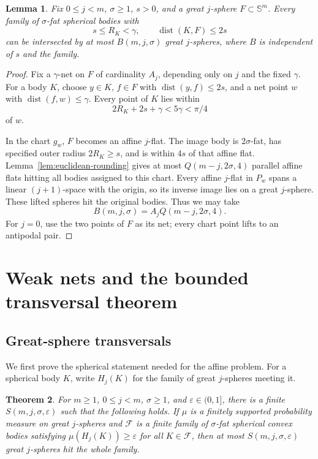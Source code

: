 \documentclass[11pt]{article}
\newtheorem{theorem}{Theorem}[section]
\newtheorem{lemma}[theorem]{Lemma}
\theoremstyle{remark}
\newcommand{\Sph}{\mathbb S}
\newcommand{\eps}{\varepsilon}
\newcommand{\dist}{\operatorname{dist}}
\begin{document}
\begin{lemma}
\label{lem:spherical-rounding}
Fix \(0\leq j<m\), \(\sigma\geq1\), \(s>0\), and a great
\(j\)-sphere \(F\subset\Sph^m\).
Every family of \(\sigma\)-fat spherical bodies with
\[
 s\leq R_K<\gamma,\qquad \dist(K,F)\leq2s
\]
can be intersected by at most \(B(m,j,\sigma)\) great \(j\)-spheres,
where \(B\) is independent of \(s\) and the family.
\end{lemma}

\begin{proof}
Fix a \(\gamma\)-net on \(F\) of cardinality \(A_j\), depending only
on \(j\) and the fixed \(\gamma\).
For a body \(K\), choose \(y\in K\), \(f\in F\) with
\(\dist(y,f)\leq2s\), and a net point \(w\) with
\(\dist(f,w)\leq\gamma\).
Every point of \(K\) lies within
\[
 2R_K+2s+\gamma<5\gamma<\pi/4
\]
of \(w\).

In the chart \(g_w\), \(F\) becomes an affine \(j\)-flat.
The image body is \(2\sigma\)-fat, has specified outer radius
\(2R_K\geq s\), and is within \(4s\) of that affine flat.
Lemma~\ref{lem:euclidean-rounding} gives at most
\(Q(m-j,2\sigma,4)\) parallel affine flats hitting all bodies
assigned to this chart.
Every affine \(j\)-flat in \(P_w\) spans a linear
\((j+1)\)-space with the origin, so its inverse image lies on a
great \(j\)-sphere. These lifted spheres hit the original bodies.
Thus we may take
\begin{equation}
 B(m,j,\sigma)=A_jQ(m-j,2\sigma,4).
 \label{eq:B}
\end{equation}
For \(j=0\), use the two points of \(F\) as its net; every chart point
lifts to an antipodal pair.
\end{proof}

\section{Weak nets and the bounded transversal theorem}
\label{sec:weaknets}

\subsection{Great-sphere transversals}

We first prove the spherical statement needed for the affine problem.
For a spherical body \(K\), write \(H_j(K)\) for the family of great
\(j\)-spheres meeting it.

\begin{theorem}
\label{thm:spherical-net}
For \(m\geq1\), \(0\leq j<m\), \(\sigma\geq1\), and
\(\eps\in(0,1]\), there is a finite
\(S(m,j,\sigma,\eps)\) such that the following holds.
If \(\mu\) is a finitely supported probability measure on great
\(j\)-spheres and \(\mathcal F\) is a finite family of
\(\sigma\)-fat spherical convex bodies satisfying
\(\mu(H_j(K))\geq\eps\) for all \(K\in\mathcal F\), then at most
\(S(m,j,\sigma,\eps)\) great \(j\)-spheres hit the whole family.
\end{theorem}
\end{document}
